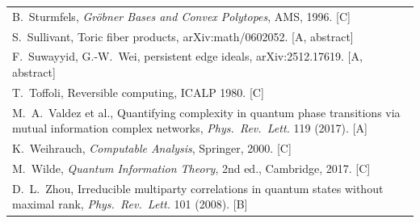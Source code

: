 \documentclass[11pt,a4paper]{article}
\newcommand{\gr}[1]{\textsf{[#1]}}
\begin{document}
\begin{tabular}{@{}p{}@{}}
B.~Sturmfels, \emph{Gröbner Bases and Convex Polytopes}, AMS, 1996. \gr{C}\\
S.~Sullivant, Toric fiber products, arXiv:math/0602052. \gr{A, abstract}\\
F.~Suwayyid, G.-W.~Wei, persistent edge ideals, arXiv:2512.17619. \gr{A, abstract}\\
T.~Toffoli, Reversible computing, ICALP 1980. \gr{C}\\
M.~A.~Valdez et al., Quantifying complexity in quantum phase transitions via mutual information complex networks, \emph{Phys.\ Rev.\ Lett.} 119 (2017). \gr{A}\\
K.~Weihrauch, \emph{Computable Analysis}, Springer, 2000. \gr{C}\\
M.~Wilde, \emph{Quantum Information Theory}, 2nd ed., Cambridge, 2017. \gr{C}\\
D.~L.~Zhou, Irreducible multiparty correlations in quantum states without maximal rank, \emph{Phys.\ Rev.\ Lett.} 101 (2008). \gr{B}\\
\end{tabular}
\end{document}
